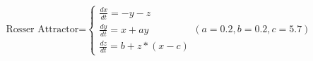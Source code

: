 \documentclass[preview]{standalone}
\begin{document}
\begin{align*}
\text{Rosser Attractor=}\begin{cases} \frac{dx}{dt} = -y-z \\ \frac{dy}{dt} = x+ay \\ \frac{dz}{dt} = b+z*(x-c) \end{cases} (a=0.2,b=0.2,c=5.7)
\end{align*}
\end{document}
